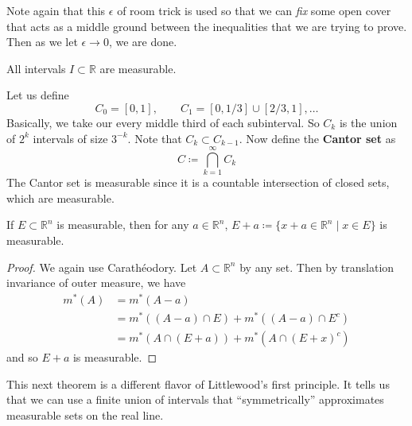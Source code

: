   Note again that this $\epsilon$ of room trick is used so that we can \textit{fix} some open cover that acts as a middle ground between the inequalities that we are trying to prove. Then as we let $\epsilon \to 0$, we are done. 

  \begin{corollary}
    All intervals $I \subset \mathbb{R}$ are measurable. 
  \end{corollary}

  \begin{example}
    Let us define 
    \begin{equation}
      C_0 = [0, 1], \qquad C_1 = [0, 1/3] \cup [2/3, 1], \ldots
    \end{equation}
    Basically, we take our every middle third of each subinterval. So $C_k$ is the union of $2^k$ intervals of size $3^{-k}$. Note that $C_k \subset C_{k-1}$. Now define the \textbf{Cantor set} as 
    \begin{equation}
      C \coloneqq \bigcap_{k=1}^\infty C_k
    \end{equation}
    The Cantor set is measurable since it is a countable intersection of closed sets, which are measurable. 
  \end{example}

  \begin{theorem}
    If $E \subset \mathbb{R}^n$ is measurable, then for any $a \in \mathbb{R}^n$, $E + a \coloneqq \{x + a \in \mathbb{R}^n \mid x \in E \}$ is measurable. 
  \end{theorem}
  \begin{proof}
    We again use Carathéodory. Let $A \subset \mathbb{R}^n$ by any set. Then by translation invariance of outer measure, we have 
    \begin{align}
      m^\ast(A) & = m^\ast (A - a) \\ 
                & = m^\ast ((A - a) \cap E) + m^\ast((A - a) \cap E^c) \\ 
                & = m^\ast (A \cap (E + a)) + m^\ast (A \cap (E + x)^c)
    \end{align}
    and so $E + a$ is measurable. 
  \end{proof}

  This next theorem is a different flavor of Littlewood's first principle. It tells us that we can use a finite union of intervals that ``symmetrically'' approximates measurable sets on the real line. 

